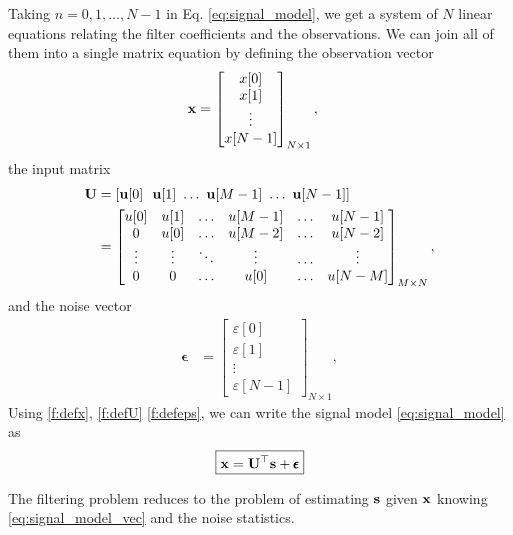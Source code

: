Taking $n=0,1,\ldots,N-1$ in Eq. \eqref{eq:signal_model}, we get a system of $N$ linear equations relating the filter coefficients and the observations. We can join all of them into a single matrix equation by defining the observation vector
\begin{align}
\label{f:defx}
{\mathbf x} &= \begin{bmatrix}
                 x[0] \\ x[1] \\ \vdots \\ x[N-1]
      \end{bmatrix}_{N\times 1},
\end{align}
the input matrix
\begin{align}
\label{f:defU}
{\mathbf U} &= [{\mathbf u}[0]~~{\mathbf u}[1]~\ldots~{\mathbf u}[M-1]~\ldots~{\mathbf u}[N-1] ]   \nonumber\\
    &= \begin{bmatrix}
                u[0]  & u[1]   & \ldots & u[M-1] & \ldots & u[N-1] \\
                0     & u[0]   & \ldots & u[M-2] & \ldots & u[N-2] \\
               \vdots & \vdots & \ddots & \vdots & \ldots & \vdots \\
               0      & 0      & \ldots & u[0]   & \ldots & u[N-M] 
       \end{bmatrix}_{M\times N},
\end{align}
and the noise vector
\begin{align}
\label{f:defeps}
\pmb{\epsilon} &= \begin{bmatrix}
                  \varepsilon[0] \\ \varepsilon[1] \\ \vdots \\ \varepsilon[N-1]
                  \end{bmatrix}_{N\times 1},
\end{align}
Using \eqref{f:defx}, \eqref{f:defU} \eqref{f:defeps}, we can write the signal model \eqref{eq:signal_model} as
\begin{equation}
\label{eq:signal_model_vec}
\boxed{{\mathbf x} ={\mathbf U}^\top {\mathbf s} + \pmb{\epsilon}}
\end{equation}

The filtering problem reduces to the problem of estimating ${\mathbf s}$ given ${\mathbf x}$ knowing \eqref{eq:signal_model_vec} and the noise statistics.

